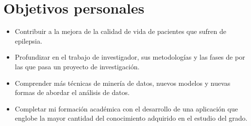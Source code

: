\section{Objetivos personales}

\begin{itemize}
	\item Contribuir a la mejora de la calidad de vida de pacientes que sufren de epilepsia.
	\item Profundizar en el trabajo de investigador, sus metodologías y las fases de por las que pasa un proyecto de investigación.
	\item Comprender más técnicas de minería de datos, nuevos modelos y nuevas formas de abordar el análisis de datos.
	\item Completar mi formación académica con el desarrollo de una aplicación que englobe la mayor cantidad del conocimiento adquirido en el estudio del grado.
\end{itemize}